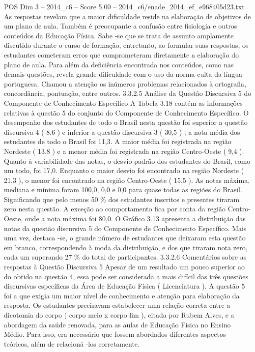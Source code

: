 \begin{textsample}{POS Dim 3 – 2014\_c6 – Score 5.00 – 2014\_c6/enade\_2014\_ef\_e968405d23.txt}
As respostas revelam que a maior dificuldade reside na elaboração de objetivos de um plano de aula.
Também é preocupante a confusão entre fisiologia e outros conteúdos da Educação Física.
Sabe -se que se trata de assunto amplamente discutido durante o curso de formação, entretanto, ao formular suas respostas, os estudantes cometeram erros que comprometeram diretamente a elaboração do plano de aula.
Para além da deficiência encontrada nos conteúdos, como nas demais questões, revela grande dificuldade com o uso da norma culta da língua portuguesa.
Chamou a atenção os inúmeros problemas relacionados à ortografia, concordância, pontuação, entre outros. 3.3.2.5 Análise da Questão Discursiva 5 do Componente de Conhecimento Específico A Tabela 3.18 contém as informações relativas à questão 5 do conjunto do Componente de Conhecimento Específico.
O desempenho dos estudantes de todo o Brasil nesta questão foi superior a questão discursiva 4 ( 8,6 ) e inferior a questão discursiva 3 ( 30,5 ) ; a nota média dos estudantes de todo o Brasil foi 11,3.
A maior média foi registrada na região Nordeste ( 13,8 ) e a menor média foi registrada na região Centro-Oeste ( 9,4 ).
Quanto à variabilidade das notas, o desvio padrão dos estudantes do Brasil, como um todo, foi 17,0.
Enquanto o maior desvio foi encontrado na região Nordeste ( 21,3 ), o menor foi encontrado na região Centro-Oeste ( 15,5 ).
As notas máxima, mediana e mínima foram 100,0, 0,0 e 0,0 para quase todas as regiões do Brasil.
Significando que pelo menos 50 \% dos estudantes inscritos e presentes tiraram zero nesta questão.
A exceção ao comportamento fica por conta da região Centro-Oeste, onde a nota máxima foi 80,0.
O Gráfico 3.13 apresenta a distribuição das notas da questão discursiva 5 do Componente de Conhecimento Específico.
Mais uma vez, destaca -se, o grande número de estudantes que deixaram esta questão em branco, correspondendo à moda da distribuição, e dos que tiraram nota zero, cada um superando 27 \% do total de participantes. 3.3.2.6 Comentários sobre as respostas à Questão Discursiva 5 Apesar de um resultado um pouco superior ao do obtido na questão 4, essa pode ser considerada a mais difícil das três questões discursivas específicas da Área de Educação Física ( Licenciatura ).
A questão 5 foi a que exigia um maior nível de conhecimento e atenção para elaboração da resposta.
Os estudantes precisavam estabelecer uma relação correta entre a dicotomia do corpo ( corpo meio x corpo fim ), citada por Rubem Alves, e a abordagem da saúde renovada, para as aulas de Educação Física no Ensino Médio.
Para isso, era necessário que fossem abordados diferentes aspectos teóricos, além de relacioná -los corretamente.

\end{textsample}
